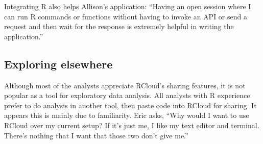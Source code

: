 Integrating R also helps Allison's application: ``Having an open session where I can run R commands or
functions without having to invoke an API or send a request and then
wait for the response is extremely helpful in writing the application.''




\subsection{Exploring elsewhere}

Although most of the analysts appreciate RCloud's sharing features,
it is not popular as a tool for exploratory data analysis.
All analysts with R experience prefer to do analysis in another
tool, then paste code into RCloud for sharing.
It appears this is mainly due to familiarity.
Eric asks, ``Why would I want to use
RCloud over my current setup? If it's just me, I like my text editor and
terminal. There's nothing that I want that those two don't give me.''




